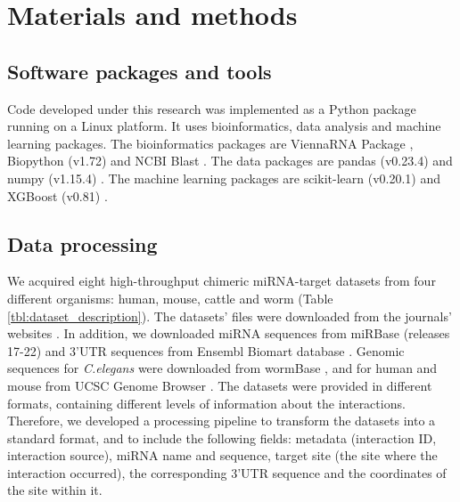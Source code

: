 \documentclass{bmcart}
\begin{document}

\clearpage
\section*{Materials and methods}
\subsection*{Software packages and tools}
Code developed under this research was implemented as a Python package running on a Linux platform. It uses bioinformatics, data analysis and machine learning packages. The bioinformatics packages are ViennaRNA Package \cite{lorenz2011viennarna}, Biopython (v1.72) \cite{cock2009biopython} and NCBI Blast \cite{altschul1990basic_blast}. The data packages are pandas (v0.23.4) \cite{mckinney2010data_pandas} and numpy (v1.15.4) \cite{oliphant2006guide_numpy}. The machine learning packages are scikit-learn (v0.20.1) \cite{pedregosa2011scikit} and XGBoost (v0.81) \cite{xgboost}.

\subsection*{Data processing}
We acquired eight high-throughput chimeric miRNA-target  datasets from four different organisms: human, mouse, cattle and worm (Table \ref{tbl:dataset_description}). The datasets' files were downloaded from the journals' websites \cite{scheel2017global, grosswendt2014unambiguous, broughton2016pairing, helwak2013mapping, darnell_moore2015mirna}. In addition, we downloaded miRNA sequences from miRBase (releases 17-22) \cite{kozomara2013mirbase} and 3'UTR sequences from Ensembl Biomart database \cite{smedley2015biomart}. Genomic sequences for \textit{C.elegans} were downloaded from wormBase \cite{lee2017wormbase}, and for human and mouse from UCSC Genome Browser \cite{karolchik2004ucsc}.
The datasets were provided in different formats, containing different levels of information about the interactions. Therefore, we developed a processing pipeline to transform the datasets into a standard format, and to include the following fields: metadata (interaction ID, interaction source), miRNA name and sequence, target site (the site where the interaction occurred), the corresponding 3'UTR sequence and the coordinates of the site within it.
\end{document}
